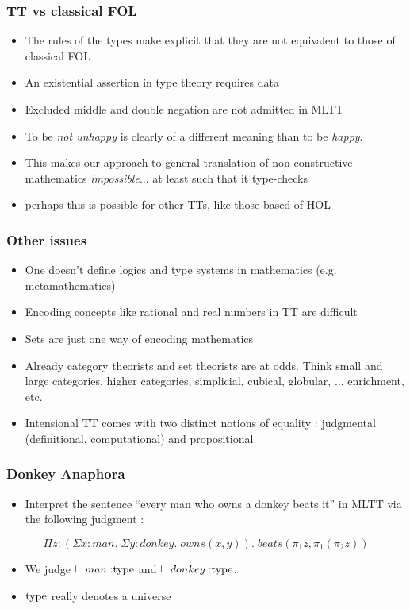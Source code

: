 \documentclass[10pt]{beamer}
\begin{document}
\begin{frame}
\frametitle{TT vs classical FOL}

\begin{itemize}
\item The rules of the types make explicit that they are not equivalent to those
  of classical FOL
\item An existential assertion in type theory requires data
\item Excluded middle and double negation are not admitted in MLTT
\item To be \emph{not unhappy} is clearly of a different meaning than to be \emph{happy}.
\item This makes our approach to general translation of non-constructive
  mathematics \emph{impossible}... at least such that it type-checks 
\item perhaps this is possible for other TTs, like those based of HOL

\end{itemize}
\end{frame}

\begin{frame}
\frametitle{Other issues}
\begin{itemize}
\item One doesn't define logics and type systems in mathematics (e.g. metamathematics)
\item Encoding concepts like rational and real numbers in TT are difficult
\item Sets are just one way of encoding mathematics
\item Already category theorists and set theorists are at odds. Think small and
  large categories, higher categories, {simplicial, cubical, globular, ...}
  enrichment, etc.
\item Intensional TT comes with two distinct notions of
  equality : judgmental (definitional, computational) and propositional
\end{itemize}
\end{frame}

\begin{frame}
\frametitle{Donkey Anaphora}

\begin{itemize}
\item Interpret the sentence ``every man who owns a donkey beats it'' in MLTT via the following judgment :
\end{itemize}

\[\Pi z : (\Sigma x : man. \; \Sigma y : donkey. \; owns(x,y)). \;
  beats(\pi_1z,\pi_1(\pi_2z))\]

\begin{itemize}
\item We judge $\vdash man \; {:} {\rm type}$ and $\vdash donkey \; {:}
{\rm type}$.
\item ${\rm type}$ really denotes a universe
\end{itemize}

\end{frame}
\end{document}
